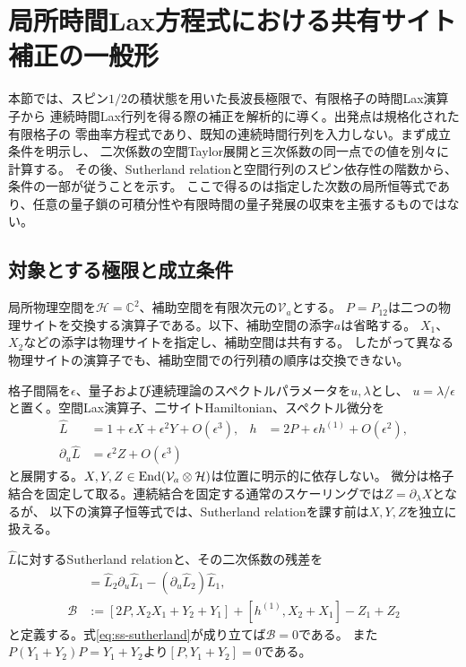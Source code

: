 \section{局所時間Lax方程式における共有サイト補正の一般形}
\label{sec:shared-site-general-proof}

本節では、スピン$1/2$の積状態を用いた長波長極限で、有限格子の時間Lax演算子から
連続時間Lax行列を得る際の補正を解析的に導く。出発点は規格化された有限格子の
零曲率方程式であり、既知の連続時間行列を入力しない。まず成立条件を明示し、
二次係数の空間Taylor展開と三次係数の同一点での値を別々に計算する。
その後、Sutherland relationと空間行列のスピン依存性の階数から、条件の一部が従うことを示す。
ここで得るのは指定した次数の局所恒等式であり、任意の量子鎖の可積分性や有限時間の量子発展の収束を主張するものではない。

\subsection{対象とする極限と成立条件}
\label{subsec:shared-conditions}

局所物理空間を$\mathcal H=\mathbb C^2$、補助空間を有限次元の$\mathcal V_a$とする。
$P=P_{12}$は二つの物理サイトを交換する演算子である。以下、補助空間の添字$a$は省略する。
$X_1$、$X_2$などの添字は物理サイトを指定し、補助空間は共有する。
したがって異なる物理サイトの演算子でも、補助空間での行列積の順序は交換できない。

格子間隔を$\epsilon$、量子および連続理論のスペクトルパラメータを$u,\lambda$とし、
$u=\lambda/\epsilon$と置く。空間Lax演算子、二サイトHamiltonian、スペクトル微分を
\begin{align}
\widehat L&=1+\epsilon X+\epsilon^2Y+O(\epsilon^3),
&h&=2P+\epsilon h^{(1)}+O(\epsilon^2),\label{eq:ss-expansion}\\
\partial_u\widehat L&=\epsilon^2Z+O(\epsilon^3)
\label{eq:ss-spectral-derivative}
\end{align}
と展開する。$X,Y,Z\in\operatorname{End}(\mathcal V_a\otimes\mathcal H)$は位置に明示的に依存しない。
微分は格子結合を固定して取る。連続結合を固定する通常のスケーリングでは$Z=\partial_\lambda X$となるが、
以下の演算子恒等式では、Sutherland relationを課す前は$X,Y,Z$を独立に扱える。

$\widehat L$に対するSutherland relationと、その二次係数の残差を
\begin{align}
[h,\widehat L_2\widehat L_1]
&=\widehat L_2\partial_u\widehat L_1-(\partial_u\widehat L_2)\widehat L_1,
\label{eq:ss-sutherland}\\
\mathcal B&:=[2P,X_2X_1+Y_2+Y_1]+[h^{(1)},X_2+X_1]-Z_1+Z_2
\label{eq:ss-residual}
\end{align}
と定義する。式\eqref{eq:ss-sutherland}が成り立てば$\mathcal B=0$である。
また$P(Y_1+Y_2)P=Y_1+Y_2$より$[P,Y_1+Y_2]=0$である。

